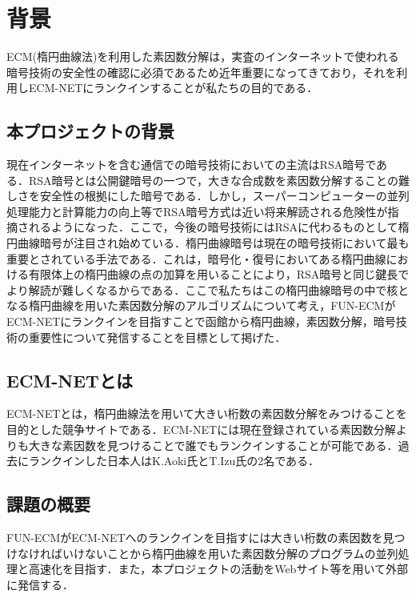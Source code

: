 \documentclass[openany,11pt,papersize]{jsbook}
\begin{document}
\chapter{背景}

ECM(楕円曲線法)を利用した素因数分解は，実査のインターネットで使われる暗号技術の安全性の確認に必須であるため近年重要になってきており，それを利用しECM-NETにランクインすることが私たちの目的である．


\section{本プロジェクトの背景}

現在インターネットを含む通信での暗号技術においての主流はRSA暗号である．RSA暗号とは公開鍵暗号の一つで，大きな合成数を素因数分解することの難しさを安全性の根拠にした暗号である．しかし，スーパーコンピューターの並列処理能力と計算能力の向上等でRSA暗号方式は近い将来解読される危険性が指摘されるようになった．ここで，今後の暗号技術にはRSAに代わるものとして楕円曲線暗号が注目され始めている．楕円曲線暗号は現在の暗号技術において最も重要とされている手法である．これは，暗号化・復号においてある楕円曲線における有限体上の楕円曲線の点の加算を用いることにより，RSA暗号と同じ鍵長でより解読が難しくなるからである．ここで私たちはこの楕円曲線暗号の中で核となる楕円曲線を用いた素因数分解のアルゴリズムについて考え，FUN-ECMがECM-NETにランクインを目指すことで函館から楕円曲線，素因数分解，暗号技術の重要性について発信することを目標として掲げた．


\section{ECM-NETとは}

ECM-NETとは，楕円曲線法を用いて大きい桁数の素因数分解をみつけることを目的とした競争サイトである．ECM-NETには現在登録されている素因数分解よりも大きな素因数を見つけることで誰でもランクインすることが可能である．過去にランクインした日本人はK.Aoki氏とT.Izu氏の2名である．


\section{課題の概要}\label{sec:gaiyou}

FUN-ECMがECM-NETへのランクインを目指すには大きい桁数の素因数を見つけなければいけないことから楕円曲線を用いた素因数分解のプログラムの並列処理と高速化を目指す．また，本プロジェクトの活動をWebサイト等を用いて外部に発信する．

\end{document}
